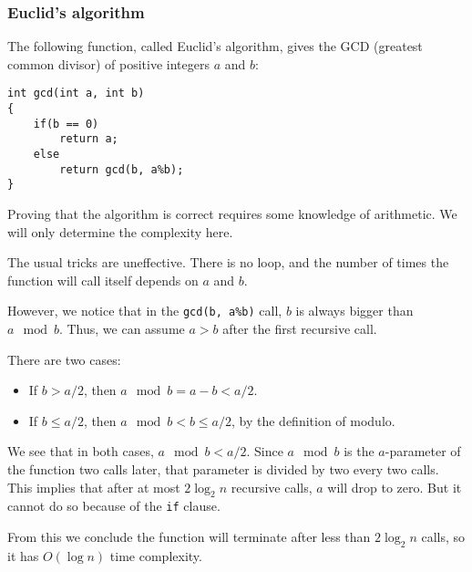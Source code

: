 \subsubsection{Euclid's algorithm}

The following function, called Euclid's algorithm,
gives the GCD (greatest common divisor)
of positive integers $a$ and $b$:

\begin{verbatim}
int gcd(int a, int b)
{
    if(b == 0)
        return a;
    else
        return gcd(b, a%b);
}
\end{verbatim}

Proving that the algorithm is correct requires some knowledge of arithmetic.
We will only determine the complexity here.

The usual tricks are uneffective.
There is no loop, and the number of times the function will call itself depends
on $a$ and $b$.

However, we notice that in the \texttt{gcd(b, a\%b)} call, $b$ is always
bigger than $a\mod b$.
Thus, we can assume $a > b$ after the first recursive call.

There are two cases:
\begin{itemize}
    \item If $b > a/2$, then $a\mod b = a-b < a/2$.
    \item If $b \leq a/2$, then $a\mod b < b \leq a/2$,
        by the definition of modulo.
\end{itemize}

We see that in both cases, $a\mod b < a/2$. Since $a\mod b$ is the $a$-parameter
of the function two calls later, that parameter is divided by two every two
calls.
This implies that after at most $2\log_2 n$ recursive calls,
$a$ will drop to zero.
But it cannot do so because of the \texttt{if} clause.

From this we conclude the function will terminate after less
than $2\log_2 n$ calls, so it has $O(\log n)$ time complexity.
